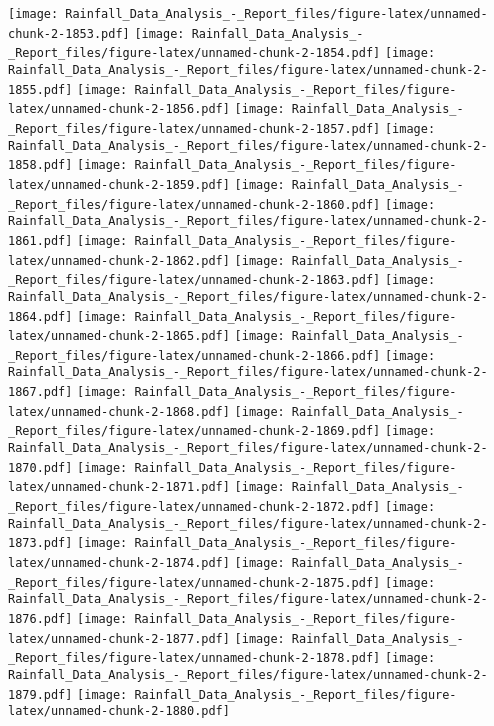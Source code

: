 \documentclass[
]{article}
\begin{document}
\texttt{[image: Rainfall\_Data\_Analysis\_-\_Report\_files/figure-latex/unnamed-chunk-2-1853.pdf]}
\texttt{[image: Rainfall\_Data\_Analysis\_-\_Report\_files/figure-latex/unnamed-chunk-2-1854.pdf]}
\texttt{[image: Rainfall\_Data\_Analysis\_-\_Report\_files/figure-latex/unnamed-chunk-2-1855.pdf]}
\texttt{[image: Rainfall\_Data\_Analysis\_-\_Report\_files/figure-latex/unnamed-chunk-2-1856.pdf]}
\texttt{[image: Rainfall\_Data\_Analysis\_-\_Report\_files/figure-latex/unnamed-chunk-2-1857.pdf]}
\texttt{[image: Rainfall\_Data\_Analysis\_-\_Report\_files/figure-latex/unnamed-chunk-2-1858.pdf]}
\texttt{[image: Rainfall\_Data\_Analysis\_-\_Report\_files/figure-latex/unnamed-chunk-2-1859.pdf]}
\texttt{[image: Rainfall\_Data\_Analysis\_-\_Report\_files/figure-latex/unnamed-chunk-2-1860.pdf]}
\texttt{[image: Rainfall\_Data\_Analysis\_-\_Report\_files/figure-latex/unnamed-chunk-2-1861.pdf]}
\texttt{[image: Rainfall\_Data\_Analysis\_-\_Report\_files/figure-latex/unnamed-chunk-2-1862.pdf]}
\texttt{[image: Rainfall\_Data\_Analysis\_-\_Report\_files/figure-latex/unnamed-chunk-2-1863.pdf]}
\texttt{[image: Rainfall\_Data\_Analysis\_-\_Report\_files/figure-latex/unnamed-chunk-2-1864.pdf]}
\texttt{[image: Rainfall\_Data\_Analysis\_-\_Report\_files/figure-latex/unnamed-chunk-2-1865.pdf]}
\texttt{[image: Rainfall\_Data\_Analysis\_-\_Report\_files/figure-latex/unnamed-chunk-2-1866.pdf]}
\texttt{[image: Rainfall\_Data\_Analysis\_-\_Report\_files/figure-latex/unnamed-chunk-2-1867.pdf]}
\texttt{[image: Rainfall\_Data\_Analysis\_-\_Report\_files/figure-latex/unnamed-chunk-2-1868.pdf]}
\texttt{[image: Rainfall\_Data\_Analysis\_-\_Report\_files/figure-latex/unnamed-chunk-2-1869.pdf]}
\texttt{[image: Rainfall\_Data\_Analysis\_-\_Report\_files/figure-latex/unnamed-chunk-2-1870.pdf]}
\texttt{[image: Rainfall\_Data\_Analysis\_-\_Report\_files/figure-latex/unnamed-chunk-2-1871.pdf]}
\texttt{[image: Rainfall\_Data\_Analysis\_-\_Report\_files/figure-latex/unnamed-chunk-2-1872.pdf]}
\texttt{[image: Rainfall\_Data\_Analysis\_-\_Report\_files/figure-latex/unnamed-chunk-2-1873.pdf]}
\texttt{[image: Rainfall\_Data\_Analysis\_-\_Report\_files/figure-latex/unnamed-chunk-2-1874.pdf]}
\texttt{[image: Rainfall\_Data\_Analysis\_-\_Report\_files/figure-latex/unnamed-chunk-2-1875.pdf]}
\texttt{[image: Rainfall\_Data\_Analysis\_-\_Report\_files/figure-latex/unnamed-chunk-2-1876.pdf]}
\texttt{[image: Rainfall\_Data\_Analysis\_-\_Report\_files/figure-latex/unnamed-chunk-2-1877.pdf]}
\texttt{[image: Rainfall\_Data\_Analysis\_-\_Report\_files/figure-latex/unnamed-chunk-2-1878.pdf]}
\texttt{[image: Rainfall\_Data\_Analysis\_-\_Report\_files/figure-latex/unnamed-chunk-2-1879.pdf]}
\texttt{[image: Rainfall\_Data\_Analysis\_-\_Report\_files/figure-latex/unnamed-chunk-2-1880.pdf]}
\end{document}
